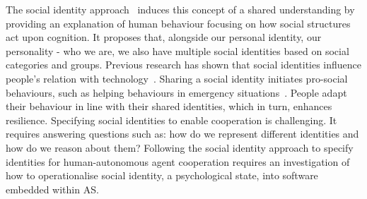 \documentclass[sigconf,nonacm]{acmart}%
\begin{document}
	The social identity approach~\cite{spears2021social} induces this concept of a shared understanding by providing an explanation of human behaviour focusing on how social structures act upon cognition. It proposes that, alongside our personal identity, our personality - who we are, we also have multiple social identities based on social categories and groups. 
	Previous research has shown that social identities influence people's relation with technology~\cite{lee2001effect}. Sharing a social identity initiates pro-social behaviours, such as helping behaviours in emergency situations~\cite{drury2018role}. People adapt their behaviour in line with their shared identities, which in turn, enhances resilience. Specifying social identities to enable cooperation is challenging. It requires answering questions such as: how do we represent different identities and how do we reason about them? Following the social identity approach to specify identities for human-autonomous agent cooperation requires an investigation of how to operationalise social identity, a psychological state, into software embedded within AS.
	
\end{document}
